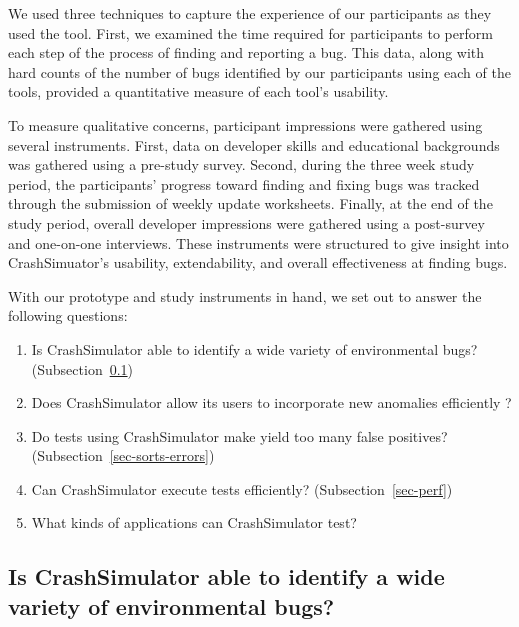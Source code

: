 We used three techniques to capture the experience of our participants as
they used the tool.  First, we examined the time required for participants
to perform each step of the process of finding and reporting a bug.
This data, along with hard counts of the number of bugs identified by our
participants using each of the tools, provided a quantitative measure of
each tool's usability.

To measure qualitative concerns,
participant impressions were gathered using
several instruments.  First, data on developer skills and educational
backgrounds was gathered using a pre-study survey.
Second, during the three week
study period, the participants' progress toward finding and fixing bugs was
tracked through the submission of weekly update worksheets.  Finally, at
the end of the study period, overall developer impressions were gathered
using a post-survey and one-on-one interviews.  These instruments were
structured to give insight into CrashSimuator's usability, extendability, and
overall effectiveness at finding bugs.

With our prototype and study instruments in hand, we
set out to answer the following questions:

\begin{enumerate}

\item{Is CrashSimulator able to identify a wide variety of environmental
    bugs?
(Subsection~\ref{sec-env-bugs})}

\item{Does CrashSimulator allow its users to incorporate new anomalies
      efficiently ?}

\item{Do tests using CrashSimulator make yield too many false positives?
      (Subsection~\ref{sec-sorts-errors})}

\item{Can CrashSimulator
      execute tests efficiently? (Subsection~\ref{sec-perf})}

\item{What kinds of applications can CrashSimulator test?}

\end{enumerate}

\subsection{Is CrashSimulator able to identify a wide variety of
environmental bugs?}
\label{sec-env-bugs}


